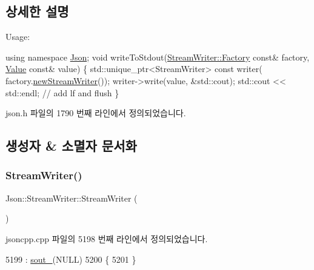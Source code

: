\subsection{상세한 설명}
Usage\+: 
\begin{DoxyCode}
\textcolor{keyword}{using namespace }\hyperlink{namespace_json}{Json};
\textcolor{keywordtype}{void} writeToStdout(\hyperlink{class_json_1_1_stream_writer_1_1_factory}{StreamWriter::Factory} \textcolor{keyword}{const}& factory, 
      \hyperlink{class_json_1_1_value}{Value} \textcolor{keyword}{const}& value) \{
  std::unique\_ptr<StreamWriter> \textcolor{keyword}{const} writer(
    factory.\hyperlink{class_json_1_1_stream_writer_1_1_factory_a9d30ec53e8288cd53befccf1009c5f31}{newStreamWriter}());
  writer->write(value, &std::cout);
  std::cout << std::endl;  \textcolor{comment}{// add lf and flush}
\}
\end{DoxyCode}
 

json.\+h 파일의 1790 번째 라인에서 정의되었습니다.



\subsection{생성자 \& 소멸자 문서화}
\mbox{\label{class_json_1_1_stream_writer_a66e6f5113618ce6b04cac9b3c85a3707}} 
\subsubsection{\texorpdfstring{Stream\+Writer()}{StreamWriter()}}
{\footnotesize\ttfamily Json\+::\+Stream\+Writer\+::\+Stream\+Writer (\begin{DoxyParamCaption}{ }\end{DoxyParamCaption})}



jsoncpp.\+cpp 파일의 5198 번째 라인에서 정의되었습니다.


\begin{DoxyCode}
5199     : \hyperlink{class_json_1_1_stream_writer_a4f5603d4228a9fa46a42cb44e5234d9b}{sout\_}(NULL)
5200 \{
5201 \}
\end{DoxyCode}
\mbox{\label{class_json_1_1_stream_writer_a03f8fb6a873b6b50f05bc4556e043c3a}} 

